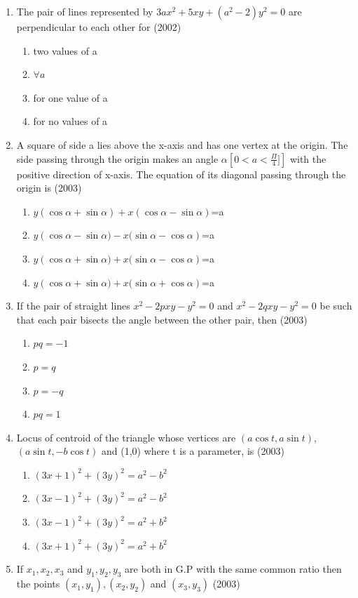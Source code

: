 \documentclass[12pt]{article}
\providecommand{\brak}[1]{\ensuremath{\left(#1\right)}}
\begin{document}
\begin{enumerate}
\begin{enumerate}
\item The pair of lines represented by $3ax^2+5xy+(a^2-2)y^2=0$ are perpendicular to each other for (2002)
\begin{enumerate}
\item two values of a 
\item $\forall a$
\item for one value of a 
\item for no values of a
\end{enumerate}
\item A square of side a lies above the x-axis and has one vertex at the origin. The side passing through the origin makes an angle $\alpha \left[ 0<a<\frac{\Pi}{4}]\right]$ with the positive direction of x-axis. The equation of its diagonal passing through the origin is (2003)
\begin{enumerate}
\item $y\brak{\cos\alpha+\sin\alpha}+x\brak{\cos\alpha-\sin\alpha}$=a
\item $y\brak{\cos\alpha-\sin\alpha)-x(\sin\alpha-\cos\alpha}$=a
\item $y\brak{\cos\alpha+\sin\alpha)+x(\sin\alpha-\cos\alpha}$=a
\item $y\brak{\cos\alpha+\sin\alpha)+x(\sin\alpha+\cos\alpha}$=a
\end{enumerate}
\item If the pair of straight lines $x^2-2pxy-y^2=0$ and $x^2-2qxy-y^2=0$ be such that each pair bisects the angle between the other pair, then (2003)
\begin{enumerate}
\item $pq=-1$  
\item $p=q$ 
\item $p=-q$  
\item $pq=1$
\end{enumerate}
\item Locus of centroid of the triangle whose vertices are $(a\cos t, a\sin t)$, $(a\sin t,-b\cos t)$ and (1,0) where t is a parameter, is (2003)
\begin{enumerate}
\item $(3x+1)^2+(3y)^2=a^2-b^2$
\item $(3x-1)^2+(3y)^2=a^2-b^2$
\item $(3x-1)^2+(3y)^2=a^2+b^2$
\item $(3x+1)^2+(3y)^2=a^2+b^2$
\end{enumerate}
\item If $x_1,x_2,x_3$ and $y_1,y_2,y_3$ are both in G.P with the same common ratio then the points $(x_1,y_1),(x_2,y_2)$ and $(x_3,y_3)$ (2003)

\end{enumerate}
\end{enumerate}
\end{document}
